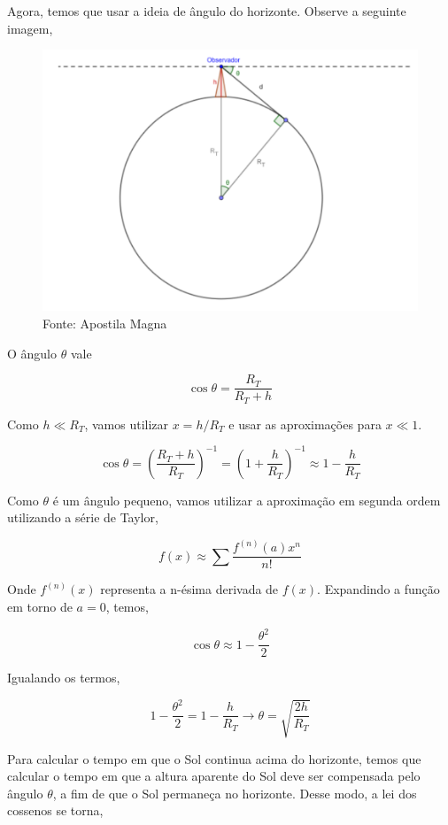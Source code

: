 \documentclass[11pt]{article}
\begin{document}
\begin{pproblem}
\begin{pssolution*}{}{ }
\begin{alternativas}
        \item Agora, temos que usar a ideia de ângulo do horizonte. Observe a seguinte imagem, 
            \begin{figure}[H]
                \centering
                \includegraphics[width=0.90\linewidth]{imagens/angulohorizonte.png}
                \caption{Fonte: Apostila Magna}
            \end{figure}

            O ângulo \(\theta\) vale

            \[\cos\theta = \frac{R_T}{R_T + h}\]

            Como \(h \ll R_T\), vamos utilizar \(x = h / R_T\) e usar as aproximações para \(x \ll 1\).

            \[\cos\theta = \left(\frac{R_T + h}{R_T}\right)^{-1} = \left(1 + \frac{h}{R_T}\right)^{-1} \approx 1 - \frac{h}{R_T}\]

            Como \(\theta\) é um ângulo pequeno, vamos utilizar a aproximação em segunda ordem utilizando a série de Taylor, 

            \[f(x) \approx \sum \frac{f^{(n)}(a) x^n}{n!}\]

            Onde \(f^{(n)}(x)\) representa a n-ésima derivada de \(f(x)\). Expandindo a função em torno de \(a = 0\), temos, 

            \[\cos\theta \approx 1 - \frac{\theta^2}{2}\]

            Igualando os termos, 

            \[1 - \frac{\theta^2}{2} = 1 - \frac{h}{R_T} \rightarrow \theta = \sqrt{\frac{2h}{R_T}}\]

            Para calcular o tempo em que o Sol continua acima do horizonte, temos que calcular o tempo em que a altura aparente do Sol deve ser compensada pelo ângulo \(\theta\), a fim de que o Sol permaneça no horizonte. Desse modo, a lei dos cossenos se torna, 


\end{alternativas}
\end{pssolution*}
\end{pproblem}
\end{document}
